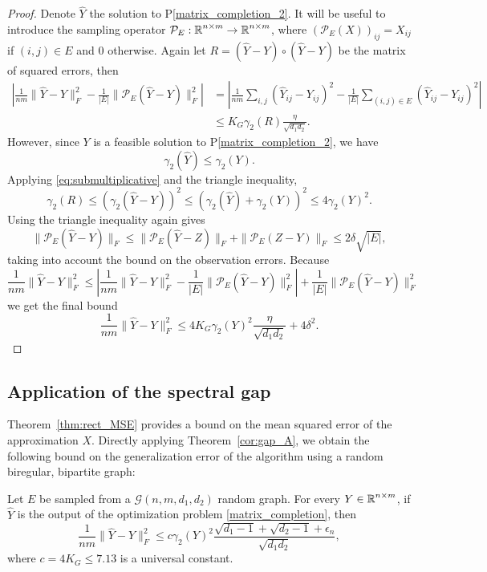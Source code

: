 \begin{proof}
Denote $\hat{Y}$ the solution to 
P\ref{matrix_completion_2}.
It will be useful to introduce the sampling operator
$\mathcal{P}_E : \operatorname{\mathbb{R}}^{n \times m} \to \operatorname{\mathbb{R}}^{n \times m}$,
where
$(\mathcal{P}_E (X) )_{ij} = X_{ij}$
if $(i,j) \in E$ and 0 otherwise.
Again let $R = (\hat{Y} - Y) \circ (\hat{Y} - Y)$
be the matrix of squared errors,
then 
\begin{align*}
\left| 
\frac{1}{nm} \| \hat{Y} - Y \|_F^2 - 
\frac{1}{|E|} \| \mathcal{P}_E (\hat{Y} - Y) \|_F^2 
\right| 
&=
\left| \frac{1}{n m} \sum_{i,j} (\hat{Y}_{ij} - Y_{ij})^2 - 
\frac{1}{|E|} \sum_{(i,j) \in E} (\hat{Y}_{ij} - Y_{ij})^2 \right| \\
& \leq K_G \gamma_2(R) \frac{\eta}{\sqrt{d_1 d_2}}.
\end{align*}
However, since $Y$ is a feasible solution to
P\ref{matrix_completion_2}, we have
\[
\gamma_2 (\hat{Y}) \leq \gamma_2 (Y).
\]
Applying \eqref{eq:submultiplicative} and the triangle inequality, 
\[
\gamma_2 (R) \leq \left( \gamma_2(\hat{Y} - Y) \right)^2
\leq \left( \gamma_2(\hat{Y}) + \gamma_2(Y) \right)^2
\leq 4 \gamma_2(Y)^2 .
\]
Using the triangle inequality again gives
\[
\| \mathcal{P}_E (\hat{Y} - Y) \|_F
\leq
\| \mathcal{P}_E (\hat{Y} - Z) \|_F
+
\| \mathcal{P}_E (Z - Y) \|_F
\leq 2 \delta \sqrt{|E|},
\]
taking into account the bound on the observation errors.
Because
\[
\frac{1}{nm} \| \hat{Y} - Y \|_F^2
\leq
\left| 
 \frac{1}{nm} \| \hat{Y} - Y \|_F^2 - 
 \frac{1}{|E|} \| \mathcal{P}_E (\hat{Y} - Y) \|_F^2 
\right| 
+
\frac{1}{|E|} \| \mathcal{P}_E (\hat{Y} - Y) \|_F^2 
\]
we get the final bound
\[
\frac{1}{n m} \| \hat{Y} - Y \|_F^2
\leq
4 K_G \gamma_2(Y)^2 \frac{\eta}{\sqrt{d_1 d_2}} + 4 \delta^2.
\]
\end{proof}

\subsection{Application of the spectral gap}

Theorem~\ref{thm:rect_MSE} provides a bound on the mean squared error
of the approximation $X$. 
Directly applying Theorem~\ref{cor:gap_A}, 
we obtain the following bound on 
the generalization error of the algorithm using a 
random biregular, bipartite graph:
\begin{corollary}
Let $E$ be sampled from a $\mathcal{G}(n,m, d_1, d_2)$ random graph.
For every $Y \in \operatorname{\mathbb{R}}^{n \times m}$, if $\hat{Y}$ is the output of the optimization problem 
\eqref{matrix_completion}, then 
\[
	\frac{1}{n m} \| \hat{Y} - Y \|_F^2 \leq 
      c \gamma_2(Y)^2 \frac{\sqrt{d_1 - 1} + \sqrt{d_2 - 1} + \epsilon_n }{\sqrt{d_1 d_2}} ,
\]
where $c = 4 K_G \leq 7.13$ is a universal constant.
\end{corollary}

